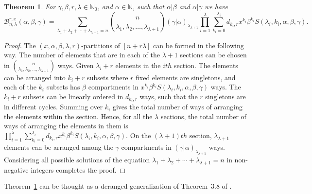 \documentclass[12pt]{amsart}
\newtheorem{proof 1}{proof 1}
\newtheorem{theorem}{Theorem}[section]
\begin{document}
\begin{theorem}For $\gamma,\beta,r,\lambda\in\mathbb{N}_0$, and $\alpha\in \mathbb{N}$, such that ${\alpha}|\beta$ and ${\alpha}|\gamma$ we have\label{theorem:33}\fontsize{10}{1}
	\begin{equation}
		\mathcal{B}^{r,x}_{n,\lambda}(\alpha,\beta,\gamma)=\sum\limits_{\lambda_1+\lambda_2+\cdots+\lambda_{\lambda+1}=n}\binom{n}{\lambda_1,\lambda_2,\ldots,\lambda_{\lambda+1}}(\gamma|\alpha)_{\lambda_{\lambda+1}}\prod_{i=1}^{\lambda}\sum_{k_i=0}^{\lambda_i}d_{k_i,r}x^{k_i}\beta^{k_i} S(\lambda_i,k_i,\alpha,\beta,\gamma).
	\end{equation}
\end{theorem}
\begin{proof} The $(x,\alpha,\beta,\lambda,r)$-partitions of $[n+r\lambda]$ can be formed in the following way. The number of elements that are in each of the $\lambda+1$ sections can be chosen in $\binom{n}{\lambda_1,\lambda_2,\ldots,\lambda_{\lambda+1}}$ ways. Given $\lambda_i+r$ elements in the $ith$ section. The elements can be arranged into $k_i+r$ subsets where $r$ fixed elements are singletons, and each of the $k_i$ subsets has $\beta$ compartments in $x^{k_i}\beta^{k_i} S(\lambda_i,k_i,\alpha,\beta,\gamma)$ ways. The $k_i+r$ subsets can be linearly ordered in $d_{k_i,r}$ ways, such that the $r$ singletons are in different cycles. Summing over $k_i$ gives the total number of ways of arranging the elements within the section. Hence, for all the $\lambda$ sections, the total number of ways of arranging the elements in them is $\prod_{i=1}^{\lambda}\sum_{k_i=0}^{\lambda_i}d_{k_i,r}x^{k_i}\beta^{k_i} S(\lambda_i,k_i,\alpha,\beta,\gamma)$. On the $(\lambda+1)th$ section, $\lambda_{\lambda+1}$ elements can be arranged among the $\gamma$ compartments in $(\gamma|\alpha)_{\lambda_{\lambda+1}}$ ways. Considering all possible solutions of the equation $\lambda_1+\lambda_2+\cdots+\lambda_{\lambda+1}=n$ in non-negative integers completes the proof.
\end{proof}

Theorem~\ref{theorem:33} can be thought as a deranged generalization of  Theorem~3.8 of \cite{nkonkobe2020combinatorial}.
\end{document}
